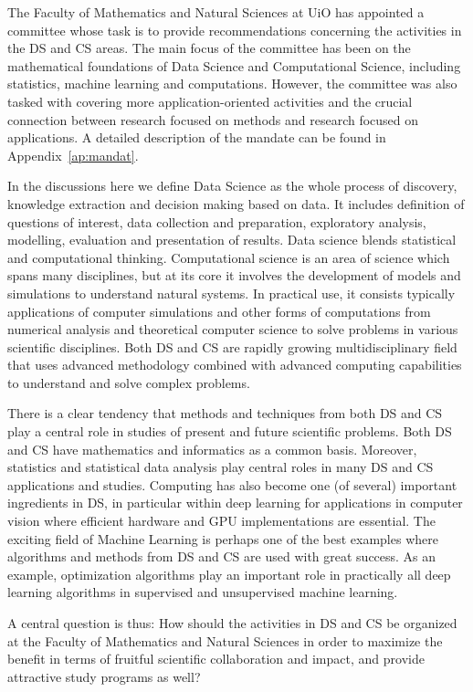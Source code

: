 \documentclass[a4paper,10pt]{article}
\begin{document}
The Faculty of Mathematics and Natural Sciences at UiO has appointed a committee whose task is to provide recommendations concerning the activities in the DS and CS areas. The main focus of the committee has been on the mathematical foundations of Data Science and Computational Science, including statistics, machine learning and computations. However, the committee was also tasked with covering  more application-oriented activities %
and the crucial connection between research focused on methods  and research focused on applications. A detailed description of the mandate can be found in Appendix~\ref{ap:mandat}. 

In the discussions here we define Data Science as the whole process of discovery, knowledge extraction and decision making based on data. It includes
definition of questions of interest, data collection and preparation, exploratory analysis, modelling,
evaluation and presentation of results.  Data science blends statistical and computational thinking.
Computational science is an area of science which spans many disciplines, but at its core it involves the development of models and simulations to understand natural systems. In practical use, it consists  typically applications of computer simulations and other forms of computations from numerical analysis and theoretical computer science to solve problems in various scientific disciplines. Both DS and CS are rapidly growing multidisciplinary field that uses advanced methodology combined with advanced computing capabilities to understand and solve complex problems.

There is a clear tendency that methods and techniques from both DS and CS play a central role in  studies of present and future scientific problems.  Both DS and CS have mathematics and informatics as a common basis. Moreover, statistics and statistical data analysis  play central roles in many DS and CS applications and studies.  Computing has
also become one (of several) important ingredients in DS, in particular  within deep
learning for applications in computer vision where efficient hardware and GPU implementations
are  essential. The  exciting   field  of  Machine  Learning  is  perhaps  one  of  the  best  examples
where algorithms and methods from DS and CS are used with great success.  As an example, optimization algorithms play an important role in practically  all deep learning algorithms in supervised and unsupervised machine learning. 

A central question is thus: 
How should the activities in DS and CS be organized at the Faculty of Mathematics and Natural Sciences in order to maximize the benefit in terms of fruitful scientific collaboration and impact, and provide attractive study programs as well?
\end{document}
